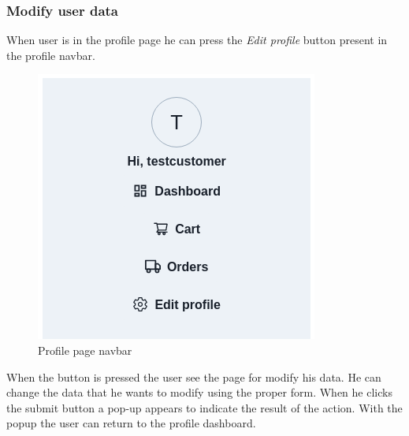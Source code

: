 \subsubsection{Modify user data}
When user is in the profile page he can press the \textit{Edit profile} button present in the profile navbar.
\begin{figure}[!ht]
    \caption{Profile page navbar}
    \vspace{10px}
    \includegraphics[scale=0.5]{../../../../Images/userManual/dashboardNavBar.png}
    \centering
\end{figure}
When the button is pressed the user see the page for modify his data. He can change the data that he wants to modify using the proper form. When he clicks the submit button a pop-up appears to indicate the result of the action. With the popup the user can return to the profile dashboard.
